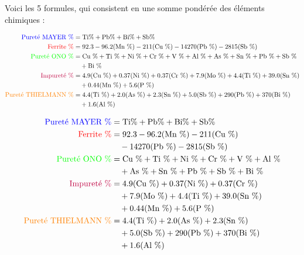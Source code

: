 \documentclass[12pt]{article}
\begin{document}
Voici les 5 formules, qui consistent en une somme pondérée des éléments chimiques :


\begin{align*}
    \textcolor{blue}{\text{Pureté MAYER \%}} &= \text{Ti\%} + \text{Pb\%} + \text{Bi\%} + \text{Sb\%} \\
    \textcolor{red}{\text{Ferrite \%}} &= 92.3 - 96.2 (\text{Mn \%}) - 211 (\text{Cu \%}) - 14270 (\text{Pb \%}) - 2815 (\text{Sb \%}) \\
    \textcolor{green}{\text{Pureté ONO \%}} &= \text{Cu \%} + \text{Ti \%} + \text{Ni \%} + \text{Cr \%} + \text{V \%} + \text{Al \%} + \text{As \%}  + \text{Sn \%} + \text{Pb \%} + \text{Sb \%} \\
    &\quad + \text{Bi \%} \\
    \textcolor{purple}{\text{Impureté \%}} &= 4.9 (\text{Cu \%}) + 0.37 (\text{Ni \%}) + 0.37 (\text{Cr \%})  + 7.9 (\text{Mo \%}) + 4.4 (\text{Ti \%}) + 39.0 (\text{Sn \%}) \\ 
    &\quad + 0.44 (\text{Mn \%}) + 5.6 (\text{P \%}) \\
    \textcolor{orange}{\text{Pureté THIELMANN \%}} &= 4.4 (\text{Ti \%}) + 2.0 (\text{As \%}) + 2.3 (\text{Sn \%}) + 5.0 (\text{Sb \%}) + 290 (\text{Pb \%}) + 370 (\text{Bi \%}) \\
    &\quad + 1.6 (\text{Al \%})
\end{align*}


\begin{align*}
    \textcolor{blue}{\text{Pureté MAYER \%}} &= \text{Ti\%} + \text{Pb\%} + \text{Bi\%} + \text{Sb\%} \\
    \textcolor{red}{\text{Ferrite \%}} &= 92.3 - 96.2 (\text{Mn \%}) - 211 (\text{Cu \%}) \\
    &\quad - 14270 (\text{Pb \%}) - 2815 (\text{Sb \%}) \\
    \textcolor{green}{\text{Pureté ONO \%}} &= \text{Cu \%} + \text{Ti \%} + \text{Ni \%} + \text{Cr \%} + \text{V \%} + \text{Al \%} \\
    &\quad + \text{As \%}  + \text{Sn \%} + \text{Pb \%} + \text{Sb \%} + \text{Bi \%} \\
    \textcolor{purple}{\text{Impureté \%}} &= 4.9 (\text{Cu \%}) + 0.37 (\text{Ni \%}) + 0.37 (\text{Cr \%}) \\
    &\quad + 7.9 (\text{Mo \%}) + 4.4 (\text{Ti \%}) + 39.0 (\text{Sn \%}) \\
    &\quad + 0.44 (\text{Mn \%}) + 5.6 (\text{P \%}) \\
    \textcolor{orange}{\text{Pureté THIELMANN \%}} &= 4.4 (\text{Ti \%}) + 2.0 (\text{As \%}) + 2.3 (\text{Sn \%}) \\
    &\quad + 5.0 (\text{Sb \%}) + 290 (\text{Pb \%}) + 370 (\text{Bi \%}) \\
    &\quad + 1.6 (\text{Al \%})
    \end{align*}
    
\end{document}

